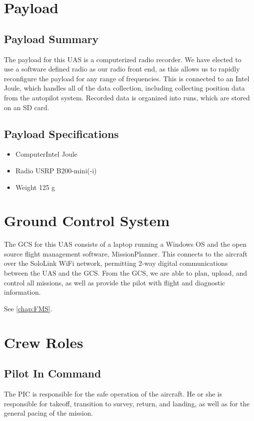 \documentclass{report}
\begin{document}
	\section{Payload}
		\subsection{Payload Summary}
			The payload for this \gls{UAS} is a computerized radio recorder.  We have elected to use a software defined radio as our radio front end, as this allows us to rapidly reconfigure the payload for any range of frequencies.  This is connected to an Intel Joule, which handles all of the data collection, including collecting position data from the autopilot system.  Recorded data is organized into runs, which are stored on an SD card.
		\subsection{Payload Specifications}
			\begin{itemize}
				\item Computer\hfill Intel Joule
				\item Radio \hfill USRP B200-mini(-i)
				\item Weight \hfill 125 g
			\end{itemize}
	\section{Ground Control System}
		The \gls{GCS} for this \gls{UAS} consists of a laptop running a Windows OS and the open source flight management software, MissionPlanner.  This connects to the aircraft over the SoloLink WiFi network, permitting 2-way digital communications between the \gls{UAS} and the \gls{GCS}.  From the \gls{GCS}, we are able to plan, upload, and control all missions, as well as provide the pilot with flight and diagnostic information.
		
		See \autoref{chap:FMS}.
	\section{Crew Roles}
		\subsection{Pilot In Command}
			The \gls{PIC} is responsible for the safe operation of the aircraft.  He or she is responsible for takeoff, transition to survey, return, and landing, as well as for the general pacing of the mission.
\end{document}
